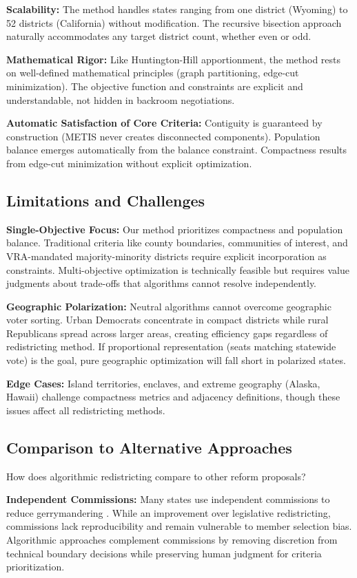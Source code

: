 \textbf{Scalability:} The method handles states ranging from one district (Wyoming) to 52 districts (California) without modification. The recursive bisection approach naturally accommodates any target district count, whether even or odd.

\textbf{Mathematical Rigor:} Like Huntington-Hill apportionment, the method rests on well-defined mathematical principles (graph partitioning, edge-cut minimization). The objective function and constraints are explicit and understandable, not hidden in backroom negotiations.

\textbf{Automatic Satisfaction of Core Criteria:} Contiguity is guaranteed by construction (METIS never creates disconnected components). Population balance emerges automatically from the balance constraint. Compactness results from edge-cut minimization without explicit optimization.
\subsection{Limitations and Challenges}

\textbf{Single-Objective Focus:} Our method prioritizes compactness and population balance. Traditional criteria like county boundaries, communities of interest, and VRA-mandated majority-minority districts require explicit incorporation as constraints. Multi-objective optimization is technically feasible but requires value judgments about trade-offs that algorithms cannot resolve independently.

\textbf{Geographic Polarization:} Neutral algorithms cannot overcome geographic voter sorting. Urban Democrats concentrate in compact districts while rural Republicans spread across larger areas, creating efficiency gaps regardless of redistricting method. If proportional representation (seats matching statewide vote) is the goal, pure geographic optimization will fall short in polarized states.

\textbf{Edge Cases:} Island territories, enclaves, and extreme geography (Alaska, Hawaii) challenge compactness metrics and adjacency definitions, though these issues affect all redistricting methods.
\subsection{Comparison to Alternative Approaches}

How does algorithmic redistricting compare to other reform proposals?

\textbf{Independent Commissions:} Many states use independent commissions to reduce gerrymandering \cite{stephanopoulos2015partisan}. While an improvement over legislative redistricting, commissions lack reproducibility and remain vulnerable to member selection bias. Algorithmic approaches complement commissions by removing discretion from technical boundary decisions while preserving human judgment for criteria prioritization.


